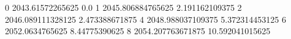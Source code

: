 0 2043.61572265625 0.0
1 2045.806884765625 2.191162109375
2 2046.089111328125 2.473388671875
4 2048.988037109375 5.372314453125
6 2052.0634765625 8.44775390625
8 2054.207763671875 10.592041015625
